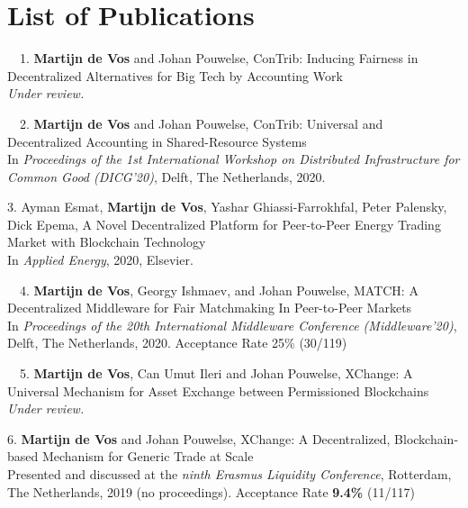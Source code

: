 \chapter*{List of Publications}
\label{publications}

\begin{etaremune}{%
\item[\faFileTextO~~1.] \textbf{Martijn de Vos} and Johan Pouwelse, ConTrib: Inducing Fairness in Decentralized Alternatives for Big Tech by Accounting Work\\
\emph{Under review.}
		
\item[\faFileTextO~~2.] \textbf{Martijn de Vos} and Johan Pouwelse, ConTrib: Universal and Decentralized Accounting in Shared-Resource Systems\\
In \emph{Proceedings of the 1st International Workshop on Distributed Infrastructure for Common Good (DICG'20)}, Delft, The Netherlands, 2020.

\item[3.] Ayman Esmat, \textbf{Martijn de Vos}, Yashar Ghiassi-Farrokhfal, Peter Palensky, Dick Epema, A Novel Decentralized Platform for Peer-to-Peer Energy Trading Market with Blockchain Technology\\
In \emph{Applied Energy}, 2020, Elsevier.
		
\item[\faFileTextO~~4.] \textbf{Martijn de Vos}, Georgy Ishmaev, and Johan Pouwelse, MATCH: A Decentralized Middleware for Fair Matchmaking In
Peer-to-Peer Markets\\
In \emph{Proceedings of the 20th International Middleware Conference (Middleware'20)}, Delft, The Netherlands, 2020. Acceptance Rate 25\% (30/119)

\item[\faFileTextO~~5.] \textbf{Martijn de Vos}, Can Umut Ileri and Johan Pouwelse, XChange: A Universal Mechanism for Asset Exchange between Permissioned Blockchains\\
\emph{Under review.}

\item[6.] \textbf{Martijn de Vos} and Johan Pouwelse, XChange: A Decentralized, Blockchain-based Mechanism for Generic Trade at Scale\\
Presented and discussed at the \emph{ninth Erasmus Liquidity Conference}, Rotterdam, The Netherlands, 2019 (no proceedings). Acceptance Rate \textbf{9.4\%} (11/117)

}
\end{etaremune}
